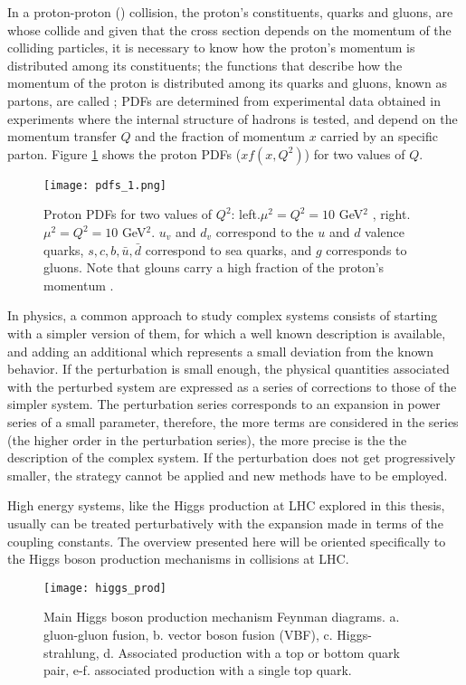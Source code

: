 In a proton-proton (\pp) collision, the proton's constituents, quarks and gluons, are whose collide and given that the \pp cross section depends on the momentum of the colliding particles, it is necessary to know how the proton's momentum is distributed among its constituents; the functions that describe how the momentum of the proton is distributed among its quarks and gluons, known as partons, are called ; PDFs are determined from experimental data obtained in experiments where the internal structure of hadrons is tested, and depend on the momentum transfer $Q$ and the fraction of momentum $x$ carried by an specific parton. Figure \ref{fig:pdfs} shows the proton PDFs ($xf(x,Q^2)$) for two values of $Q$.     

\begin{figure}[!h]
\centering
\texttt{[image: pdfs\_1.png]}
\caption[Proton PDFs]{Proton PDFs for two values of $Q^2$: left.$\mu^2=Q^2=10$ GeV$^2$ , right. $\mu^2=Q^2=10$ GeV$^2$. $u_v$ and $d_v$ correspond to the $u$ and $d$ valence quarks, $s, c, b, \bar{u}, \bar{d}$ correspond to sea quarks, and $g$ corresponds to gluons. Note that glouns carry a high fraction of the proton's momentum \cite{pdg}.}
\label{fig:pdfs}
\end{figure}

In physics, a common approach to study complex systems consists of starting with a simpler version of them, for which a well known description is available, and adding an additional  which represents a small deviation from the known behavior. If the perturbation is small enough, the physical quantities associated with the perturbed system are expressed as a series of corrections to those of the simpler system. The perturbation series corresponds to an expansion in power series of a small parameter, therefore, the more terms are considered in the series (the higher order in the perturbation series), the more precise is the the description of the complex system. If the perturbation does not get progressively smaller, the strategy cannot be applied and new methods have to be employed. 

High energy systems, like the Higgs production at LHC explored in this thesis, usually can be treated perturbatively with the expansion made in terms of the coupling constants. The overview presented here will be oriented specifically to the Higgs boson production mechanisms in \pp collisions at LHC.

\begin{figure}[!h]
\centering
\texttt{[image: higgs\_prod]}
\caption[Higgs boson production mechanism Feynman diagrams]{Main Higgs boson production mechanism Feynman diagrams. a. gluon-gluon fusion, b. vector boson fusion (VBF), c. Higgs-strahlung, d. Associated production with a top or bottom quark pair, e-f. associated production with a single top quark.}
\label{higgs_prod}
\end{figure}

